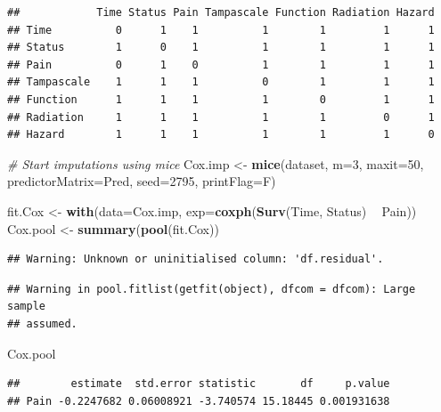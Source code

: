 \documentclass[]{book}
\newenvironment{Shaded}{\begin{snugshade}}{\end{snugshade}}
\newcommand{\KeywordTok}[1]{\textcolor[rgb]{0.13,0.29,0.53}{\textbf{#1}}}
\newcommand{\DataTypeTok}[1]{\textcolor[rgb]{0.13,0.29,0.53}{#1}}
\newcommand{\DecValTok}[1]{\textcolor[rgb]{0.00,0.00,0.81}{#1}}
\newcommand{\StringTok}[1]{\textcolor[rgb]{0.31,0.60,0.02}{#1}}
\newcommand{\CommentTok}[1]{\textcolor[rgb]{0.56,0.35,0.01}{\textit{#1}}}
\newcommand{\OperatorTok}[1]{\textcolor[rgb]{0.81,0.36,0.00}{\textbf{#1}}}
\newcommand{\NormalTok}[1]{#1}
\begin{document}
\begin{verbatim}
##            Time Status Pain Tampascale Function Radiation Hazard
## Time          0      1    1          1        1         1      1
## Status        1      0    1          1        1         1      1
## Pain          0      1    0          1        1         1      1
## Tampascale    1      1    1          0        1         1      1
## Function      1      1    1          1        0         1      1
## Radiation     1      1    1          1        1         0      1
## Hazard        1      1    1          1        1         1      0
\end{verbatim}

\begin{Shaded}
\begin{Highlighting}[]
\CommentTok{# Start imputations using mice}
\NormalTok{Cox.imp <-}\StringTok{ }\KeywordTok{mice}\NormalTok{(dataset, }\DataTypeTok{m=}\DecValTok{3}\NormalTok{, }\DataTypeTok{maxit=}\DecValTok{50}\NormalTok{, }\DataTypeTok{predictorMatrix=}\NormalTok{Pred, }\DataTypeTok{seed=}\DecValTok{2795}\NormalTok{, }\DataTypeTok{printFlag=}\NormalTok{F)}

\NormalTok{fit.Cox <-}\StringTok{ }\KeywordTok{with}\NormalTok{(}\DataTypeTok{data=}\NormalTok{Cox.imp, }\DataTypeTok{exp=}\KeywordTok{coxph}\NormalTok{(}\KeywordTok{Surv}\NormalTok{(Time, Status) }\OperatorTok{~}\StringTok{ }\NormalTok{Pain))}
\NormalTok{Cox.pool <-}\StringTok{ }\KeywordTok{summary}\NormalTok{(}\KeywordTok{pool}\NormalTok{(fit.Cox))}
\end{Highlighting}
\end{Shaded}

\begin{verbatim}
## Warning: Unknown or uninitialised column: 'df.residual'.
\end{verbatim}

\begin{verbatim}
## Warning in pool.fitlist(getfit(object), dfcom = dfcom): Large sample
## assumed.
\end{verbatim}

\begin{Shaded}
\begin{Highlighting}[]
\NormalTok{Cox.pool}
\end{Highlighting}
\end{Shaded}

\begin{verbatim}
##        estimate  std.error statistic       df     p.value
## Pain -0.2247682 0.06008921 -3.740574 15.18445 0.001931638
\end{verbatim}
\end{document}
